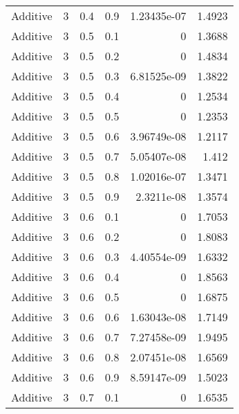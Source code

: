 \documentclass{article}
\begin{document}
\begin{longtable}[H]{lrrrrr}
 Additive       &       3 &   0.4 &            0.9 &      1.23435e-07 &          1.4923 \\
 Additive       &       3 &   0.5 &            0.1 &      0           &          1.3688 \\
 Additive       &       3 &   0.5 &            0.2 &      0           &          1.4834 \\
 Additive       &       3 &   0.5 &            0.3 &      6.81525e-09 &          1.3822 \\
 Additive       &       3 &   0.5 &            0.4 &      0           &          1.2534 \\
 Additive       &       3 &   0.5 &            0.5 &      0           &          1.2353 \\
 Additive       &       3 &   0.5 &            0.6 &      3.96749e-08 &          1.2117 \\
 Additive       &       3 &   0.5 &            0.7 &      5.05407e-08 &          1.412  \\
 Additive       &       3 &   0.5 &            0.8 &      1.02016e-07 &          1.3471 \\
 Additive       &       3 &   0.5 &            0.9 &      2.3211e-08  &          1.3574 \\
 Additive       &       3 &   0.6 &            0.1 &      0           &          1.7053 \\
 Additive       &       3 &   0.6 &            0.2 &      0           &          1.8083 \\
 Additive       &       3 &   0.6 &            0.3 &      4.40554e-09 &          1.6332 \\
 Additive       &       3 &   0.6 &            0.4 &      0           &          1.8563 \\
 Additive       &       3 &   0.6 &            0.5 &      0           &          1.6875 \\
 Additive       &       3 &   0.6 &            0.6 &      1.63043e-08 &          1.7149 \\
 Additive       &       3 &   0.6 &            0.7 &      7.27458e-09 &          1.9495 \\
 Additive       &       3 &   0.6 &            0.8 &      2.07451e-08 &          1.6569 \\
 Additive       &       3 &   0.6 &            0.9 &      8.59147e-09 &          1.5023 \\
 Additive       &       3 &   0.7 &            0.1 &      0           &          1.6535 \\

\end{longtable}
\end{document}
